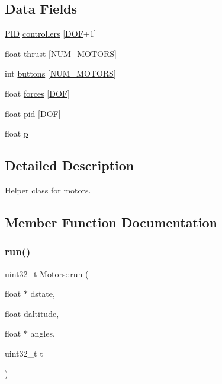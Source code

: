 \subsection*{Data Fields}
\begin{DoxyCompactItemize}
\item 
\hyperlink{structPID}{P\+ID} \hyperlink{structMotors_a6b5a477eb6136d5aff447d7ced589d89}{controllers} \mbox{[}\hyperlink{config_8h_ab5c558d88abd9517fb657be4889ee1bc}{D\+OF}+1\mbox{]}
\item 
float \hyperlink{structMotors_ac8d20987287ffda85eed109c3bf80a12}{thrust} \mbox{[}\hyperlink{config_8h_ae84658f12c2f1b44f59af36678cf3dcc}{N\+U\+M\+\_\+\+M\+O\+T\+O\+RS}\mbox{]}
\item 
int \hyperlink{structMotors_a84b2ea1a929743410df7ead8212b767a}{buttons} \mbox{[}\hyperlink{config_8h_ae84658f12c2f1b44f59af36678cf3dcc}{N\+U\+M\+\_\+\+M\+O\+T\+O\+RS}\mbox{]}
\item 
float \hyperlink{structMotors_a17cb9b1c3fc7749984c4622439901f84}{forces} \mbox{[}\hyperlink{config_8h_ab5c558d88abd9517fb657be4889ee1bc}{D\+OF}\mbox{]}
\item 
float \hyperlink{structMotors_a94c46cb5dab8c60c9fae75cc6b7af629}{pid} \mbox{[}\hyperlink{config_8h_ab5c558d88abd9517fb657be4889ee1bc}{D\+OF}\mbox{]}
\item 
float \hyperlink{structMotors_a46e39ac60edebef57fca46f878e2c0b5}{p}
\end{DoxyCompactItemize}


\subsection{Detailed Description}
Helper class for motors. 

\subsection{Member Function Documentation}
\mbox{\label{structMotors_adfcaebaa831f46e37b33757ad2c131f8}} 
\subsubsection{\texorpdfstring{run()}{run()}}
{\footnotesize\ttfamily uint32\+\_\+t Motors\+::run (\begin{DoxyParamCaption}\item[{float $\ast$}]{dstate,  }\item[{float}]{daltitude,  }\item[{float $\ast$}]{angles,  }\item[{uint32\+\_\+t}]{t }\end{DoxyParamCaption})}



